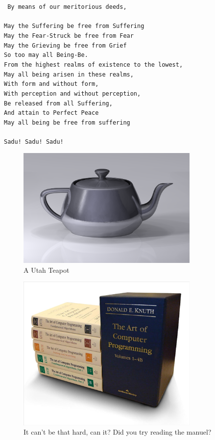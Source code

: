 \documentclass[12pt]{book}
\begin{document}
\texttt{
By means of our meritorious deeds,\\
\\
May the Suffering be free from Suffering\\
May the Fear-Struck be free from Fear\\
May the Grieving be free from Grief\\
So too may all Being-Be.\\
From the highest realms of existence to the lowest,\\
May all being arisen in these realms,\\
With form and without form,\\
With perception and without perception,\\
Be released from all Suffering,\\
And attain to Perfect Peace\\
May all being be free from suffering\\
\\
Sadu! Sadu! Sadu!
}

\begin{figure}
    \centering
    \includegraphics[width=0.8\textwidth]{figures/utah.png}
    \caption{A Utah Teapot \cite{teapot}}
\end{figure}

\begin{figure}
    \centering
    \includegraphics[width=0.8\textwidth]{figures/aocp.jpg}
    \caption{It can't be that hard, can it? Did you try reading the manuel? \cite{eulerarchive}}
\end{figure}
\end{document}
